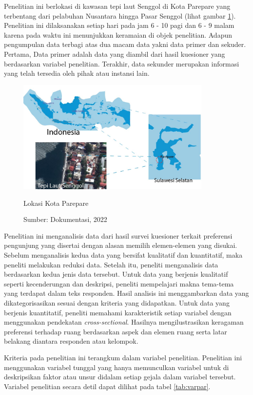 \documentclass[11pt]{udthesis} %
\begin{document}
Penelitian ini berlokasi di kawasan tepi laut Senggol di Kota Parepare yang terbentang dari pelabuhan Nusantara hingga Pasar Senggol (lihat gambar \ref{fig:lokzi}). Penelitian ini dilaksanakan setiap hari pada jam 6 - 10 pagi dan 6 - 9 malam karena pada waktu ini menunjukkan keramaian di objek penelitian. Adapun pengumpulan data terbagi atas dua macam data yakni data primer dan sekuder. Pertama, Data primer adalah data yang diambil dari hasil kuesioner yang berdasarkan variabel penelitian. Terakhir, data sekunder merupakan informasi yang telah tersedia oleh pihak atau instansi lain.

\begin{figure}[htpb]
    \centering
    \includegraphics[width=0.86\textwidth]{figures/lokzi}
    \caption{Lokasi Kota Parepare}
    \caption*{Sumber: Dokumentasi, 2022}
    \label{fig:lokzi}
\end{figure}

Penelitian ini menganalisis data dari hasil survei kuesioner terkait preferensi pengunjung yang disertai dengan alasan memilih elemen-elemen yang disukai. Sebelum menganalisis kedua data yang bersifat kualitatif dan kuantitatif, maka peneliti melakukan reduksi data. Setelah itu, peneliti menganalisis data berdasarkan kedua jenis data tersebut.
Untuk data yang berjenis kualitatif seperti kecenderungan dan deskripsi, peneliti mempelajari makna tema-tema yang terdapat dalam teks responden.
Hasil analisis ini menggambarkan data yang dikategorisasikan sesuai dengan kriteria yang didapatkan.
Untuk data yang berjenis kuantitatif, peneliti memahami karakteristik setiap variabel dengan menggunakan pendekatan \textit{cross-sectional}. Hasilnya mengilustrasikan keragaman preferensi terhadap ruang berdasarkan aspek dan elemen ruang serta latar belakang diantara responden atau kelompok.

Kriteria pada penelitian ini terangkum dalam variabel penelitian. Penelitian ini menggunakan variabel tunggal yang hanya memunculkan variabel untuk di deskripsikan faktor atau unsur didalam setiap gejala dalam variabel tersebut. Variabel penelitian secara detil dapat dilihat pada tabel \ref {tab:varpar}.
\newpage
\end{document}
